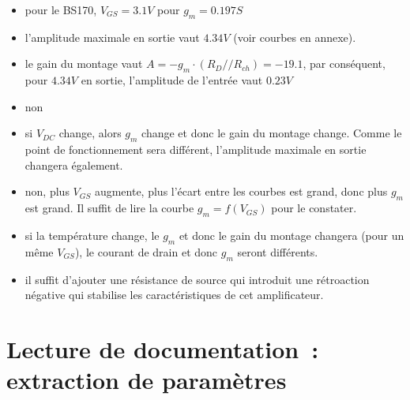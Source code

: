 \documentclass{../template/tp}
\begin{document}
{
\begin{itemize}
\item pour le BS170, $V_{GS}=3.1V$ pour $g_m=0.197S$
\item l'amplitude maximale en sortie vaut $4.34V$ (voir courbes en annexe).
\item le gain du montage vaut $A=-g_m\cdot \left(R_D//R_{ch}\right)=-19.1$, par conséquent, pour $4.34V$ en sortie, l'amplitude de l'entrée vaut $0.23V$
\item non
\item si $V_{DC}$ change, alors $g_m$ change et donc le gain du montage change. Comme le point de fonctionnement sera différent, l'amplitude maximale en sortie changera également.
\item non, plus $V_{GS}$ augmente, plus l'écart entre les courbes est grand, donc plus $g_m$ est grand. Il suffit de lire la courbe $g_m=f(V_{GS})$ pour le constater.
\item si la température change, le $g_m$ et donc le gain du montage changera (pour un même $V_{GS}$), le courant de drain et donc $g_m$ seront différents.
\item il suffit d'ajouter une résistance de source qui introduit une rétroaction négative qui stabilise les caractéristiques de cet amplificateur. 
\end{itemize}
}

\section{Lecture de documentation~: extraction de paramètres}
\end{document}
